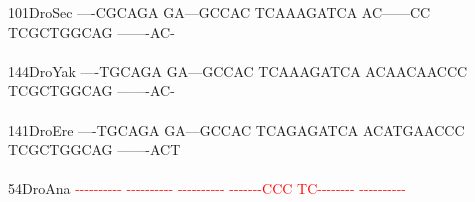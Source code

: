 \documentclass[11pt,twoside,reqno,a4paper]{article}
\begin{document}
{101\hspace*{1\charwidth}DroSec	----CGCAGA	GA---GCCAC	TCAAAGATCA	AC------CC	TCGCTGGCAG	-------AC-	\\
\hspace*{4\charwidth}\hspace*{7\charwidth}\hspace*{1\charwidth}\hspace*{1\charwidth}\hspace*{1\charwidth}\hspace*{1\charwidth}\hspace*{1\charwidth}\hspace*{1\charwidth}\\
144\hspace*{1\charwidth}DroYak	----TGCAGA	GA---GCCAC	TCAAAGATCA	ACAACAACCC	TCGCTGGCAG	-------AC-	\\
\hspace*{4\charwidth}\hspace*{7\charwidth}\hspace*{1\charwidth}\hspace*{1\charwidth}\hspace*{1\charwidth}\hspace*{1\charwidth}\hspace*{1\charwidth}\hspace*{1\charwidth}\\
141\hspace*{1\charwidth}DroEre	----TGCAGA	GA---GCCAC	TCAGAGATCA	ACATGAACCC	TCGCTGGCAG	-------ACT	\\
\hspace*{4\charwidth}\hspace*{7\charwidth}\hspace*{1\charwidth}\hspace*{1\charwidth}\hspace*{1\charwidth}\hspace*{1\charwidth}\hspace*{1\charwidth}\hspace*{1\charwidth}\\
54\hspace*{2\charwidth}DroAna	\textcolor{Red}{-}\textcolor{Red}{-}\textcolor{Red}{-}\textcolor{Red}{-}\textcolor{Red}{-}\textcolor{Red}{-}\textcolor{Red}{-}\textcolor{Red}{-}\textcolor{Red}{-}\textcolor{Red}{-}	\textcolor{Red}{-}\textcolor{Red}{-}\textcolor{Red}{-}\textcolor{Red}{-}\textcolor{Red}{-}\textcolor{Red}{-}\textcolor{Red}{-}\textcolor{Red}{-}\textcolor{Red}{-}\textcolor{Red}{-}	\textcolor{Red}{-}\textcolor{Red}{-}\textcolor{Red}{-}\textcolor{Red}{-}\textcolor{Red}{-}\textcolor{Red}{-}\textcolor{Red}{-}\textcolor{Red}{-}\textcolor{Red}{-}\textcolor{Red}{-}	\textcolor{Red}{-}\textcolor{Red}{-}\textcolor{Red}{-}\textcolor{Red}{-}\textcolor{Red}{-}\textcolor{Red}{-}\textcolor{Red}{-}\textcolor{Red}{C}\textcolor{Red}{C}\textcolor{Red}{C}	\textcolor{Red}{T}\textcolor{Red}{C}\textcolor{Red}{-}\textcolor{Red}{-}\textcolor{Red}{-}\textcolor{Red}{-}\textcolor{Red}{-}\textcolor{Red}{-}\textcolor{Red}{-}\textcolor{Red}{-}	\textcolor{Red}{-}\textcolor{Red}{-}\textcolor{Red}{-}\textcolor{Red}{-}\textcolor{Red}{-}\textcolor{Red}{-}\textcolor{Red}{-}\textcolor{Red}{-}\textcolor{Red}{-}\textcolor{Red}{-}	\\
}
\end{document}
